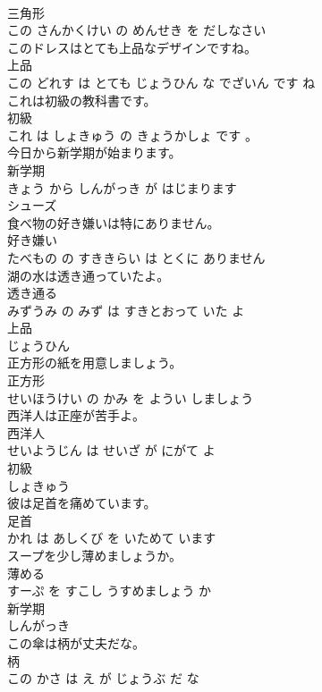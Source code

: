 \documentclass[8pt]{extreport}
\begin{document}
\begin{CJK}{UTF8}{min}
\\	三角形 
\\	この さんかくけい の めんせき を だしなさい			
\\	このドレスはとても上品なデザインですね。	
\\	上品 
\\	この どれす は とても じょうひん な でざいん です ね			
\\	これは初級の教科書です。	
\\	初級 
\\	これ は しょきゅう の きょうかしょ です 。			
\\	今日から新学期が始まります。	
\\	新学期 
\\	きょう から しんがっき が はじまります			
\\	シューズ	
\\	食べ物の好き嫌いは特にありません。	
\\	好き嫌い 
\\	たべもの の すききらい は とくに ありません			
\\	湖の水は透き通っていたよ。	
\\	透き通る 
\\	みずうみ の みず は すきとおって いた よ			
\\	上品	
\\	じょうひん			
\\	正方形の紙を用意しましょう。	
\\	正方形 
\\	せいほうけい の かみ を ようい しましょう			
\\	西洋人は正座が苦手よ。	
\\	西洋人 
\\	せいようじん は せいざ が にがて よ			
\\	初級	
\\	しょきゅう			
\\	彼は足首を痛めています。	
\\	足首 
\\	かれ は あしくび を いためて います			
\\	スープを少し薄めましょうか。	
\\	薄める 
\\	すーぷ を すこし うすめましょう か			
\\	新学期	
\\	しんがっき			
\\	この傘は柄が丈夫だな。	
\\	柄 
\\	この かさ は え が じょうぶ だ な			

\end{CJK}
\end{document}
